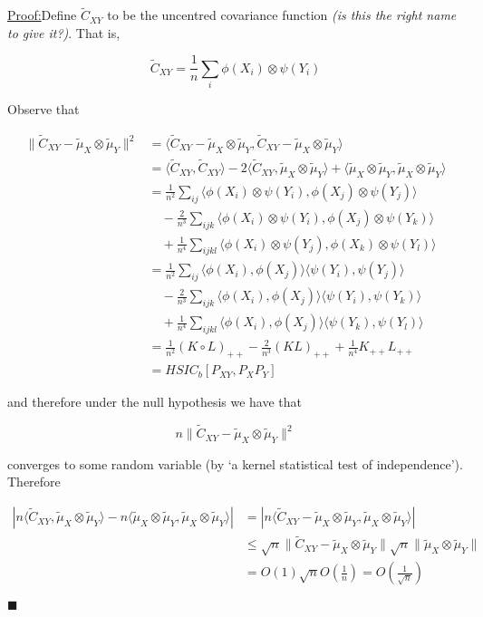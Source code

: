 \documentclass{article}
\newenvironment{claimproof}[1]{\par\noindent\underline{Proof:}\space#1}{\hfill $\blacksquare$}
\begin{document}
\begin{claimproof}[2]
Define $\tilde{C}_{XY}$ to be the uncentred covariance function \emph{(is this the right name to give it?)}. That is,

\[\tilde{C}_{XY} = \frac{1}{n}\sum_i\phi(X_i)\otimes\psi(Y_i)
\]

Observe that

\begin{align*}
\|\tilde{C}_{XY}- \tilde{\mu}_X \otimes \tilde{\mu}_Y \|^2 &= \langle \tilde{C}_{XY}- \tilde{\mu}_X \otimes \tilde{\mu}_Y,\tilde{C}_{XY}- \tilde{\mu}_X \otimes \tilde{\mu}_Y\rangle \\&=
\langle \tilde{C}_{XY},\tilde{C}_{XY}\rangle - 2\langle \tilde{C}_{XY},\tilde{\mu}_X \otimes \tilde{\mu}_Y\rangle + \langle \tilde{\mu}_X \otimes \tilde{\mu}_Y,\tilde{\mu}_X \otimes \tilde{\mu}_Y\rangle \\ &=
\frac{1}{n^2}\sum_{ij}\langle \phi(X_i)\otimes\psi(Y_i),\phi(X_j)\otimes\psi(Y_j)\rangle \\&\quad - \frac{2}{n^3}\sum_{ijk}\langle \phi(X_i)\otimes\psi(Y_i),\phi(X_j)\otimes\psi(Y_k)\rangle \\&\quad + \frac{1}{n^4}\sum_{ijkl}\langle \phi(X_i)\otimes\psi(Y_j),\phi(X_k)\otimes\psi(Y_l)\rangle\\&=
\frac{1}{n^2}\sum_{ij}\langle \phi(X_i),\phi(X_j)\rangle \langle \psi(Y_i),\psi(Y_j)\rangle \\&\quad -
\frac{2}{n^3}\sum_{ijk}\langle \phi(X_i),\phi(X_j)\rangle \langle \psi(Y_i),\psi(Y_k)\rangle \\&\quad +
\frac{1}{n^4}\sum_{ijkl}\langle \phi(X_i),\phi(X_j)\rangle \langle \psi(Y_k),\psi(Y_l)\rangle \\&=
\frac{1}{n^2}(K\circ L)_{++} - \frac{2}{n^3}(KL)_{++} + \frac{1}{n^4}K_{++}L_{++} \\&=
HSIC_b[P_{XY},P_XP_Y]
\end{align*}

and therefore under the null hypothesis we have that

\[n\|\tilde{C}_{XY}- \tilde{\mu}_X \otimes \tilde{\mu}_Y \|^2\]

converges to some random variable (by `a kernel statistical test of independence'). Therefore

\begin{align*}
|n\langle\tilde{C}_{XY}, \tilde{\mu}_X \otimes \tilde{\mu}_Y \rangle - n\langle\tilde{\mu}_X \otimes \tilde{\mu}_Y, \tilde{\mu}_X \otimes \tilde{\mu}_Y \rangle| &= |n\langle\tilde{C}_{XY} - \tilde{\mu}_X \otimes \tilde{\mu}_Y, \tilde{\mu}_X \otimes \tilde{\mu}_Y \rangle| \\&\leq
\sqrt{n}\|\tilde{C}_{XY} - \tilde{\mu}_X \otimes \tilde{\mu}_Y\|\sqrt{n}\|\tilde{\mu}_X \otimes \tilde{\mu}_Y\| \\&=
O(1)\sqrt{n} O(\frac{1}{n}) = O(\frac{1}{\sqrt{n}})
\end{align*}


\end{claimproof}
\end{document}
